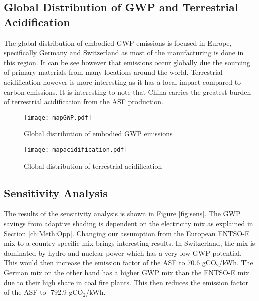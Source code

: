 \subsection{Global Distribution of GWP and Terrestrial Acidification}

The global distribution of embodied GWP emissions is focused in Europe, specifically Germany and Switzerland as most of the manufacturing is done in this region. It can be see however that emissions occur globally due the sourcing of primary materials from many locations around the world. Terrestrial acidification however is more interesting as it has a local impact compared to carbon emissions. It is interesting to note that China carries the greatest burden of terrestrial acidification from the ASF production.
 
\begin{figure}[H]
\begin{center}
\texttt{[image: mapGWP.pdf]}
\caption{Global distribution of embodied GWP emissions}
\label{fig:mapGWP}
\end{center}
\end{figure}

\begin{figure}[H]
\begin{center}
\texttt{[image: mapacidification.pdf]}
\caption{Global distribution of terrestrial acidification}
\label{fig:mapAcid}
\end{center}
\end{figure}

\subsection{Sensitivity Analysis}

The results of the sensitivity analysis is shown in Figure \ref{fig:sens}. The GWP savings from adaptive shading is dependent on the electricity mix as explained in Section \ref{ch:Meth:Opp}. Changing our assumption from the European ENTSO-E mix to a country specific mix brings interesting results. In Switzerland, the mix is dominated by hydro and nuclear power which has a very low GWP potential\cite{itten2012life}. This would then increase the emission factor of the ASF to 70.6 gCO${_2}$/kWh.
The German mix on the other hand has a higher GWP mix than the ENTSO-E mix due to their high share in coal fire plants. This then reduces the emission factor of the ASF to -792.9 gCO${_2}$/kWh.\\

